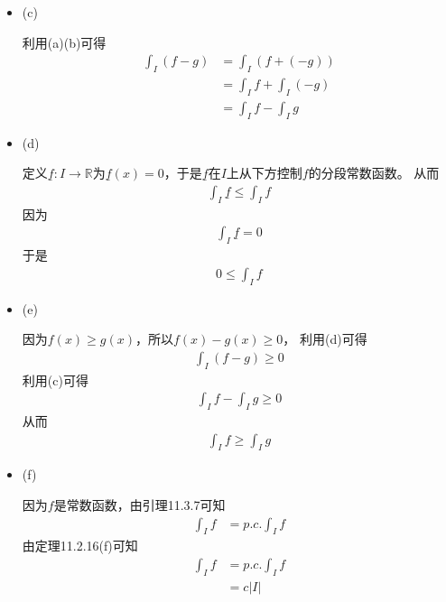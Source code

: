 \documentclass{article}
\begin{document}
\begin{itemize}
  \item (c)

        利用(a)(b)可得
        \begin{align*}
          \int_I (f - g) & = \int_I (f + (- g))      \\
                         & = \int_I f + \int_I (- g) \\
                         & = \int_I f - \int_I g
        \end{align*}

  \item (d)

        定义$\underline{f}: I \to \mathbb{R}$为$\underline{f}(x) = 0$，于是$\underline{f}$在$I$上从下方控制$f$的分段常数函数。
        从而
        \begin{align*}
          \int_I \underline{f} \leq \int_I f
        \end{align*}
        因为
        \begin{align*}
          \int_I \underline{f} = 0
        \end{align*}
        于是
        \begin{align*}
          0 \leq \int_I f
        \end{align*}

  \item (e)

        因为$f(x) \geq g(x)$，所以$f(x) - g(x) \geq 0$，
        利用(d)可得
        \begin{align*}
          \int_I (f - g) \geq 0
        \end{align*}
        利用(c)可得
        \begin{align*}
          \int_I f - \int_I g \geq 0
        \end{align*}
        从而
        \begin{align*}
          \int_I f \geq \int_I g
        \end{align*}

  \item (f)

        因为$f$是常数函数，由引理11.3.7可知
        \begin{align*}
          \int_I f & = p.c.\int_I f
        \end{align*}
        由定理11.2.16(f)可知
        \begin{align*}
          \int_I f & = p.c.\int_I f \\
                   & = c|I|
        \end{align*}


\end{itemize}
\end{document}
